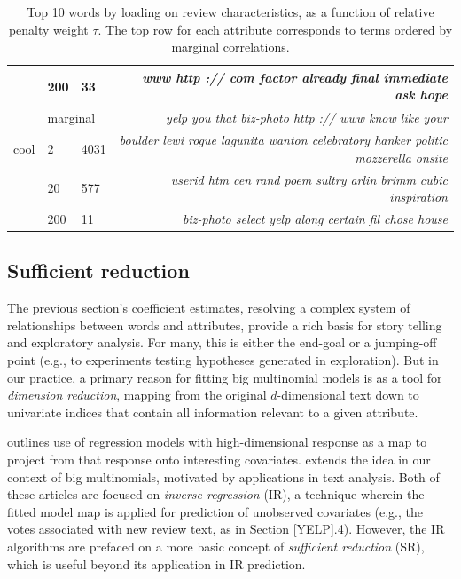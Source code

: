 \documentclass[12pt]{article}
\begin{document}
\begin{table}[b!]
\begin{tabular}{cll|r}
 & 200 & 33 & \footnotesize\it  www http :// com factor already final immediate ask hope \\
\hline
 &  \multicolumn{2}{l|}{marginal}   & \footnotesize\it  yelp you that biz-photo http :// www know like your \\
\small cool & 2 & 4031 & \footnotesize\it  boulder lewi rogue lagunita wanton celebratory hanker politic mozzerella onsite \\
 & 20 & 577 & \footnotesize\it  userid htm cen rand poem sultry arlin brimm cubic inspiration \\
 & 200 & 11 & \footnotesize\it  biz-photo select yelp along certain fil chose house  \\
\hline\end{tabular}
\caption[l]{\label{topwords}
Top 10 words by loading on review characteristics, as a function of relative
penalty weight $\tau$.  The top row for each attribute  corresponds to terms ordered by
marginal correlations.}
\end{table}


\subsection{Sufficient reduction}

The previous section's coefficient estimates, resolving a complex system of
 relationships between words and attributes,  provide a rich basis for
story telling and exploratory analysis. For many, this is either the end-goal
or a jumping-off point (e.g., to experiments testing hypotheses generated
in exploration).  But in our practice, a primary reason for fitting big
multinomial models is as a tool for {\it dimension reduction}, mapping from
the original $d$-dimensional text down to univariate indices that contain all
information relevant to a given attribute.  

\cite{cook_fisher_2007} outlines use of regression models with
high-dimensional response as a map to project from that response onto
interesting covariates.   \cite{taddy_multinomial_2013} extends the idea in
our context of big multinomials, motivated by applications in text analysis.
Both of these articles are focused on {\it inverse regression} (IR), a
technique wherein the fitted model map is applied for prediction of unobserved
covariates (e.g., the votes associated with new review text, as in Section
\ref{YELP}.4).  However, the IR algorithms are prefaced on a more basic
concept of {\it sufficient reduction} (SR), which is useful beyond its
application in IR prediction.
\end{document}
